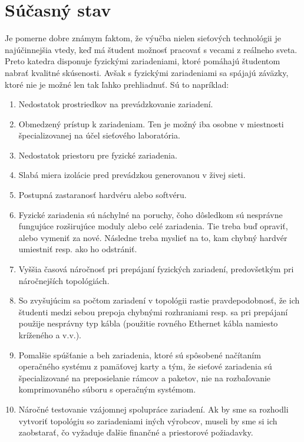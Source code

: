 \chapter{Súčasný stav}

Je pomerne dobre známym faktom, že výučba nielen sieťových technológii je najúčinnejšia vtedy, keď má študent možnosť pracovať s vecami z reálneho sveta. Preto katedra disponuje fyzickými zariadeniami, ktoré pomáhajú študentom nabrať kvalitné skúsenosti. Avšak s fyzickými zariadeniami sa spájajú záväzky, ktoré nie je možné len tak ľahko prehliadnuť. Sú to napríklad:

\begin{enumerate}[noitemsep]
    \item Nedostatok prostriedkov na prevádzkovanie zariadení.
    \item Obmedzený prístup k zariadeniam. Ten je možný iba osobne v miestnosti špecializovanej na účel sieťového laboratória.
    \item Nedostatok priestoru pre fyzické zariadenia.
    \item Slabá miera izolácie pred prevádzkou generovanou v živej sieti.
    \item Postupná zastaranosť hardvéru alebo softvéru.
    \item Fyzické zariadenia sú náchylné na poruchy, čoho dôsledkom sú nesprávne fungujúce rozširujúce moduly alebo celé zariadenia. Tie treba buď opraviť, alebo vymeniť za nové. Následne treba myslieť na to, kam chybný hardvér umiestniť resp. ako ho odstrániť.
    \item Vyššia časová náročnosť pri prepájaní fyzických zariadení, predovšetkým pri náročnejších topológiách.
    \item So zvyšujúcim sa počtom zariadení v topológii rastie pravdepodobnosť, že ich študenti medzi sebou prepoja chybnými rozhraniami resp. sa pri prepájaní použije nesprávny typ kábla (použitie rovného Ethernet kábla namiesto kríženého a v.v.).
    \item Pomalšie spúšťanie a beh zariadenia, ktoré sú spôsobené načítaním operačného systému z pamäťovej karty a tým, že sieťové zariadenia sú špecializované na preposielanie rámcov a paketov, nie na rozbaľovanie komprimovaného súboru s operačným systémom.
    \item Náročné testovanie vzájomnej spolupráce zariadení. Ak by sme sa rozhodli vytvoriť topológiu so zariadeniami iných výrobcov, museli by sme si ich zaobstarať, čo vyžaduje ďalšie finančné a priestorové požiadavky.
\end{enumerate}

